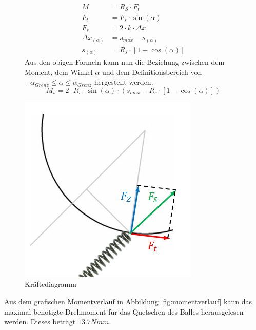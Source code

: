 \begin{figure}[h!]
    \begin{minipage}[hbt]{0.6\textwidth}
    	\begin{align}  
    	    M &= R_S \cdot F_t \\
    	    F_t &= F_s \cdot \sin(\alpha) \\ 
    	    F_s &= 2\cdot k \cdot \Delta x \\
    	    \Delta x_{(\alpha)} &= s_{max} - s_{(\alpha)} \\
    	    s_{(\alpha)} &= R_s \cdot \left[1 - \cos(\alpha)\right]
    	\end{align}
    	Aus den obigen Formeln kann nun die Beziehung zwischen dem Moment, dem Winkel 
    	$\alpha$ und dem Definitionsbereich von $-\alpha_{Grenz} \leq \alpha \leq  
    	\alpha_{Grenz}$ hergestellt werden.    	
    	\begin{equation}  
    	    M_s = 2 \cdot R_s \cdot \sin(\alpha) \cdot \left(s_{max} - R_s \cdot \left[1 - 
    	    \cos(\alpha)\right]\right)
    	\end{equation}
    \end{minipage}
\hfill
    \begin{minipage}[hbt]{0.4\textwidth}
        \includegraphics[scale=0.54,clip,trim=18mm 10mm 8mm 19mm]
        {Enddokumentation/Anhang/Bilder/Kraeftediagramm.jpg}
        \centering
        \caption{Kräftediagramm}
        \label{abb:Kraeftediagramm}
    \end{minipage}
\end{figure}
\vspace{1pt}
Aus dem grafischen Momentverlauf in Abbildung \ref{fig:momentverlauf} kann das maximal 
benötigte Drehmoment für das Quetschen des Balles herausgelesen werden. Dieses beträgt 
$13.7 Nmm$.

